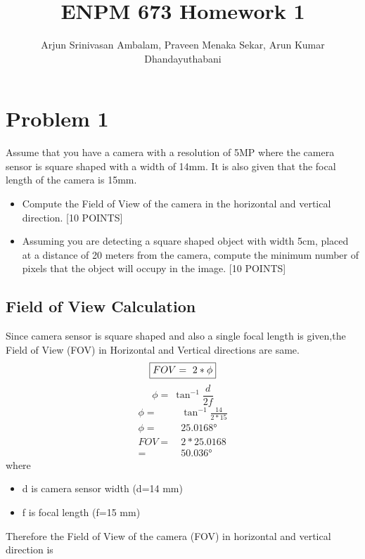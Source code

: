 \documentclass{article}
\title{ENPM 673 Homework 1}
\author{Arjun Srinivasan Ambalam, Praveen Menaka Sekar, Arun Kumar Dhandayuthabani}
\begin{document}
\maketitle

\section{Problem 1}
Assume that you have a camera with a resolution of 5MP where the camera sensor is square shaped with a width of 14mm. It is also given that the focal length of the camera is 15mm.
\begin{itemize}
\item Compute the Field of View of the camera in the horizontal and vertical direction. [10 POINTS]
\item Assuming you are detecting a square shaped object with width 5cm, placed at a distance of 20 meters from the camera, compute the minimum number of pixels that the object will occupy in the image. [10 POINTS]
\end{itemize}
\subsection{Field of View Calculation}
Since camera sensor is square shaped and also a single focal length is given,the Field of View (FOV) in Horizontal and Vertical directions are same.
\begin{equation}
\boxed{FOV =\ 2*\phi} \\
\end{equation}
\begin{equation}
\boxed{\phi = \ \tan ^{-1} \frac{d}{2f}}
\end{equation}
\begin{align*}
\phi =& \ \tan ^{ - 1}\frac{14}{2*15} \\
\phi =& \ \ang{25.0168}\\
FOV =& \ 2*25.0168 \\ =& \ \ang{50.036}
\end{align*}
where 
\begin{itemize}
\item d is camera sensor width (d=14 mm)
\item f is focal length (f=15 mm)
\end{itemize}
Therefore the Field of View of the camera (FOV) in horizontal and vertical direction is 

\end{document}
